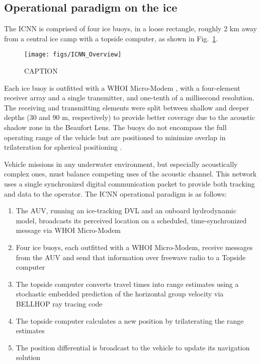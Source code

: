 \subsection{Operational paradigm on the ice}

The ICNN is comprised of four ice buoys, in a loose rectangle, roughly 2 km away from a central ice camp with a topside computer, as shown in Fig.~\ref{fig:icnnOverview}.

\begin{figure}[h!]
	\centering
	\texttt{[image: figs/ICNN\_Overview]}
	\label{fig:icnnOverview}
	\caption{CAPTION}
\end{figure}

Each ice buoy is outfitted with a WHOI Micro-Modem \citep{singh_underwater_2006}, with a four-element receiver array and a single transmitter, and one-tenth of a millisecond resolution.
The receiving and transmitting elements were split between shallow and deeper depths (30 and 90 m, respectively) to provide better coverage due to the acoustic shadow zone in the Beaufort Lens.
The buoys do not encompass the full operating range of the vehicle but are positioned to minimize overlap in trilateration for spherical positioning \citep{deffenbaugh_relationship_1996}.

Vehicle missions in any underwater environment, but especially acoustically complex ones, must balance competing uses of the acoustic channel.
This network uses a single synchronized digital communication packet to provide both tracking and data to the operator.
The ICNN operational paradigm is as follows:
\begin{enumerate}
\item The AUV, running an ice-tracking DVL and an onboard hydrodynamic model, broadcasts its perceived location on a scheduled, time-synchronized message via WHOI Micro-Modem
\item Four ice buoys, each outfitted with a WHOI Micro-Modem, receive messages from the AUV and send that information over freewave radio to a Topside computer
\item The topside computer converts travel times into range estimates using a stochastic embedded prediction of the horizontal group velocity via BELLHOP ray tracing code \citep{porter_bellhop_2011}
\item The topside computer calculates a new position by trilaterating the range estimates
\item The position differential is broadcast to the vehicle to update its navigation solution
\end{enumerate}

